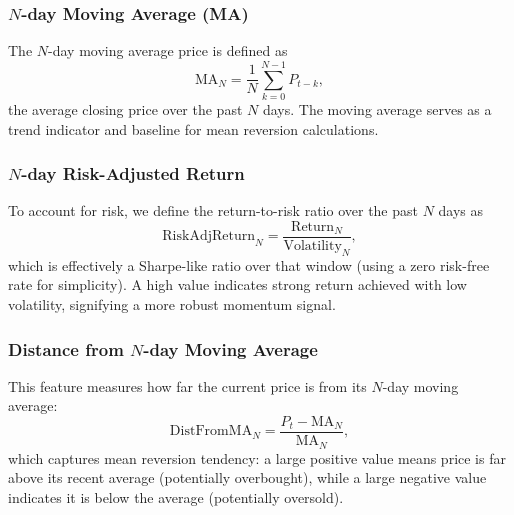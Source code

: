\documentclass[conference]{IEEEtran}
\begin{document}
\subsubsection{$N$-day Moving Average (MA)}
The $N$-day moving average price is defined as
\begin{equation}
\mathrm{MA}_N = \frac{1}{N} \sum_{k=0}^{N-1} P_{t-k},
\end{equation}
the average closing price over the past $N$ days. The moving average serves as a trend indicator and baseline for mean reversion calculations.

\subsubsection{$N$-day Risk-Adjusted Return}
To account for risk, we define the return-to-risk ratio over the past $N$ days as
\begin{equation}
\mathrm{RiskAdjReturn}_N = \frac{\mathrm{Return}_N}{\mathrm{Volatility}_N},
\end{equation}
which is effectively a Sharpe-like ratio over that window (using a zero risk-free rate for simplicity). A high value indicates strong return achieved with low volatility, signifying a more robust momentum signal.

\subsubsection{Distance from $N$-day Moving Average}
This feature measures how far the current price is from its $N$-day moving average:
\begin{equation}
\mathrm{DistFromMA}_N = \frac{P_t - \mathrm{MA}_N}{\mathrm{MA}_N},
\end{equation}
which captures mean reversion tendency: a large positive value means price is far above its recent average (potentially overbought), while a large negative value indicates it is below the average (potentially oversold).
\end{document}

